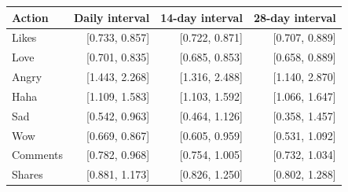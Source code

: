 \begin{tabular}{lrrr}
\toprule
Action & Daily interval & 14-day interval & 28-day interval \\
\midrule
Likes & [0.733, 0.857] & [0.722, 0.871] & [0.707, 0.889] \\
Love & [0.701, 0.835] & [0.685, 0.853] & [0.658, 0.889] \\
Angry & [1.443, 2.268] & [1.316, 2.488] & [1.140, 2.870] \\
Haha & [1.109, 1.583] & [1.103, 1.592] & [1.066, 1.647] \\
Sad & [0.542, 0.963] & [0.464, 1.126] & [0.358, 1.457] \\
Wow & [0.669, 0.867] & [0.605, 0.959] & [0.531, 1.092] \\
Comments & [0.782, 0.968] & [0.754, 1.005] & [0.732, 1.034] \\
Shares & [0.881, 1.173] & [0.826, 1.250] & [0.802, 1.288] \\
\bottomrule
\end{tabular}
